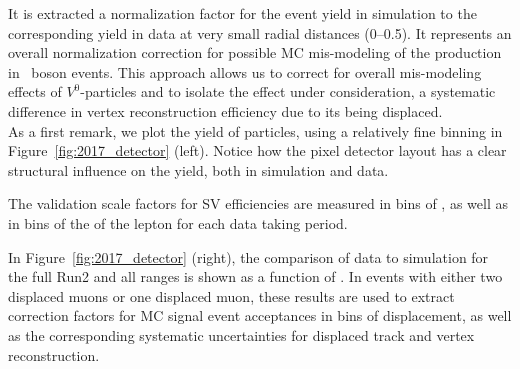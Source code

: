 It is extracted a normalization factor for the event yield in
simulation to the corresponding yield in data at very small radial
distances (0--0.5\cm). It represents an overall
normalization correction for possible MC mis-modeling of the
\PKzS production in \PZ~boson events. This approach allows us to correct for
overall mis-modeling effects of $V^0$-particles
and to isolate the effect under consideration, \ie a systematic
difference in vertex reconstruction efficiency due to its being
displaced. \\
As a first remark, we plot the yield of \PKzS particles, using a
relatively fine binning in Figure~\ref{fig:2017_detector} (left). Notice how the pixel detector layout has a clear structural influence on the yield, both in simulation and data.

The validation scale factors for SV efficiencies are
measured in bins of \Deltwod, as
well as in bins of the \pt of the lepton
for each data taking period.

In Figure~\ref{fig:2017_detector} (right), the comparison of data to simulation for the full
Run2 and all \pt ranges is shown as a function of \Deltwod.
In events with either two displaced muons or one displaced muon, these results are used to
extract correction factors for MC signal
event acceptances in bins of displacement, as well as the corresponding systematic
uncertainties for displaced track and vertex reconstruction.

